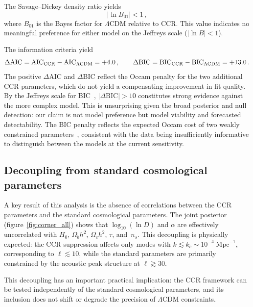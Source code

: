 The Savage--Dickey density ratio yields
\begin{equation}
|\ln B_{01}| < 1 \, ,
\end{equation}
where $B_{01}$ is the Bayes factor for $\Lambda$CDM relative to CCR.
This value indicates no meaningful preference for either model on the Jeffreys scale ($|\ln B| < 1$).

The information criteria yield
\begin{equation}
\Delta\mathrm{AIC} = \mathrm{AIC}_{\rm CCR} - \mathrm{AIC}_{\Lambda{\rm CDM}} = +4.0\,,
\qquad
\Delta\mathrm{BIC} = \mathrm{BIC}_{\rm CCR} - \mathrm{BIC}_{\Lambda{\rm CDM}} = +13.0\,.
\end{equation}
The positive $\Delta$AIC and $\Delta$BIC reflect the Occam penalty for
the two additional CCR parameters, which do not yield a compensating
improvement in fit quality. By the Jeffreys scale for
BIC~\cite{Kass:1995}, $|\Delta\mathrm{BIC}| > 10$ constitutes strong
evidence against the more complex model. This is unsurprising given the
broad posterior and null detection: our claim is not model preference
but model viability and forecasted detectability. The BIC penalty
reflects the expected Occam cost of two weakly constrained
parameters~\cite{Liddle:2007}, consistent with the data being
insufficiently informative to distinguish between the models at the
current sensitivity.

\subsection{Decoupling from standard cosmological parameters}
\label{subsec:decoupling}

A key result of this analysis is the absence of correlations between the
CCR parameters and the standard cosmological parameters. The joint
posterior (figure~\ref{fig:corner_all}) shows that $\log_{10}(\ln D)$
and $\alpha$ are effectively uncorrelated with $H_0$, $\Omega_b h^2$,
$\Omega_c h^2$, $\tau$, and~$n_s$. This decoupling is physically
expected: the CCR suppression affects only modes with
$k \lesssim k_c \sim 10^{-4}\;\mathrm{Mpc}^{-1}$, corresponding to
$\ell \lesssim 10$, while the standard parameters are primarily
constrained by the acoustic peak structure at $\ell \gtrsim 30$.

This decoupling has an important practical implication: the CCR
framework can be tested independently of the standard cosmological
parameters, and its inclusion does not shift or degrade the precision
of $\Lambda$CDM constraints.

